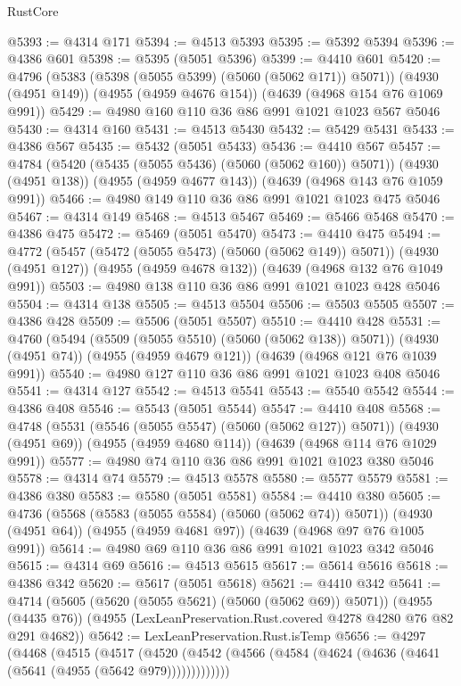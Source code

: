\begin{lexlean}{RustCore}
\begin{coremodule}
@5393 := @4314 @171
@5394 := @4513 @5393
@5395 := @5392 @5394
@5396 := @4386 @601
@5398 := @5395 (@5051 @5396)
@5399 := @4410 @601
@5420 := @4796
    (@5383 (@5398 (@5055 @5399) (@5060 (@5062 @171)) @5071))
    (@4930 (@4951 @149))
    (@4955 (@4959 @4676 @154))
    (@4639 (@4968 @154 @76 @1069 @991))
@5429 := @4980 @160 @110 @36 @86 @991 @1021 @1023 @567 @5046
@5430 := @4314 @160
@5431 := @4513 @5430
@5432 := @5429 @5431
@5433 := @4386 @567
@5435 := @5432 (@5051 @5433)
@5436 := @4410 @567
@5457 := @4784
    (@5420 (@5435 (@5055 @5436) (@5060 (@5062 @160)) @5071))
    (@4930 (@4951 @138))
    (@4955 (@4959 @4677 @143))
    (@4639 (@4968 @143 @76 @1059 @991))
@5466 := @4980 @149 @110 @36 @86 @991 @1021 @1023 @475 @5046
@5467 := @4314 @149
@5468 := @4513 @5467
@5469 := @5466 @5468
@5470 := @4386 @475
@5472 := @5469 (@5051 @5470)
@5473 := @4410 @475
@5494 := @4772
    (@5457 (@5472 (@5055 @5473) (@5060 (@5062 @149)) @5071))
    (@4930 (@4951 @127))
    (@4955 (@4959 @4678 @132))
    (@4639 (@4968 @132 @76 @1049 @991))
@5503 := @4980 @138 @110 @36 @86 @991 @1021 @1023 @428 @5046
@5504 := @4314 @138
@5505 := @4513 @5504
@5506 := @5503 @5505
@5507 := @4386 @428
@5509 := @5506 (@5051 @5507)
@5510 := @4410 @428
@5531 := @4760
    (@5494 (@5509 (@5055 @5510) (@5060 (@5062 @138)) @5071))
    (@4930 (@4951 @74))
    (@4955 (@4959 @4679 @121))
    (@4639 (@4968 @121 @76 @1039 @991))
@5540 := @4980 @127 @110 @36 @86 @991 @1021 @1023 @408 @5046
@5541 := @4314 @127
@5542 := @4513 @5541
@5543 := @5540 @5542
@5544 := @4386 @408
@5546 := @5543 (@5051 @5544)
@5547 := @4410 @408
@5568 := @4748
    (@5531 (@5546 (@5055 @5547) (@5060 (@5062 @127)) @5071))
    (@4930 (@4951 @69))
    (@4955 (@4959 @4680 @114))
    (@4639 (@4968 @114 @76 @1029 @991))
@5577 := @4980 @74 @110 @36 @86 @991 @1021 @1023 @380 @5046
@5578 := @4314 @74
@5579 := @4513 @5578
@5580 := @5577 @5579
@5581 := @4386 @380
@5583 := @5580 (@5051 @5581)
@5584 := @4410 @380
@5605 := @4736
    (@5568 (@5583 (@5055 @5584) (@5060 (@5062 @74)) @5071))
    (@4930 (@4951 @64))
    (@4955 (@4959 @4681 @97))
    (@4639 (@4968 @97 @76 @1005 @991))
@5614 := @4980 @69 @110 @36 @86 @991 @1021 @1023 @342 @5046
@5615 := @4314 @69
@5616 := @4513 @5615
@5617 := @5614 @5616
@5618 := @4386 @342
@5620 := @5617 (@5051 @5618)
@5621 := @4410 @342
@5641 := @4714
    (@5605 (@5620 (@5055 @5621) (@5060 (@5062 @69)) @5071))
    (@4955 (@4435 @76))
    (@4955 (LexLeanPreservation.Rust.covered @4278 @4280 @76 @82 @291 @4682))
@5642 := LexLeanPreservation.Rust.isTemp
@5656 := @4297
    (@4468
      (@4515
        (@4517
          (@4520 (@4542 (@4566 (@4584 (@4624 (@4636 (@4641 (@5641 (@4955 (@5642 @979)))))))))))))

\end{coremodule}
\end{lexlean}
